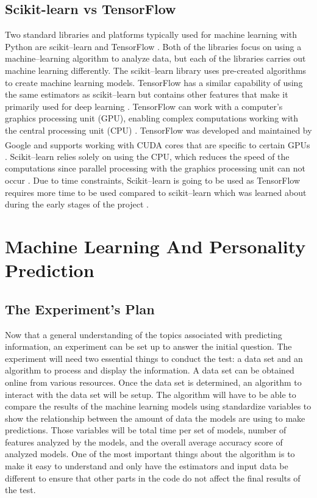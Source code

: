 \documentclass[a4paper, 12pt]{article}
\begin{document}
\subsection{Scikit-learn vs TensorFlow}
\begin{paragraph}
\indent Two standard libraries and platforms typically used for machine learning with Python are scikit--learn and TensorFlow \cite{pythonML}. Both of the libraries focus on using a machine--learning algorithm to analyze data, but each of the libraries carries out machine learning differently. The scikit--learn library uses pre-created algorithms to create machine learning models. TensorFlow has a similar capability of using the same estimators as scikit--learn but contains other features that make it primarily used for deep learning \cite{pythonML}. TensorFlow can work with a computer's graphics processing unit (GPU), enabling complex computations working with the central processing unit (CPU) \cite{pythonML}. TensorFlow was developed and maintained by Google\textsuperscript{\textregistered} and supports working with CUDA cores that are specific to certain GPUs \cite{pythonML}. Scikit--learn relies solely on using the CPU, which reduces the speed of the computations since parallel processing with the graphics processing unit can not occur \cite{pythonML}. Due to time constraints, Scikit--learn is going to be used as TensorFlow requires more time to be used compared to scikit--learn which was learned about during the early stages of the project \cite{pythonML}.
\end{paragraph}

\section{Machine Learning And Personality Prediction}

\subsection{The Experiment's Plan}
\begin{paragraph}
\indent Now that a general understanding of the topics associated with predicting information, an experiment can be set up to answer the initial question. The experiment will need two essential things to conduct the test: a data set and an algorithm to process and display the information.  A data set can be obtained online from various resources. Once the data set is determined, an algorithm to interact with the data set will be setup. The algorithm will have to be able to compare the results of the machine learning models using standardize variables to show the relationship between the amount of data the models are using to make predictions. Those variables will be total time per set of models, number of features analyzed by the models, and the overall average accuracy score of analyzed models. One of the most important things about the algorithm is to make it easy to understand and only have the estimators and input data be different to ensure that other parts in the code do not affect the final results of the test.
\end{paragraph}
\end{document}
